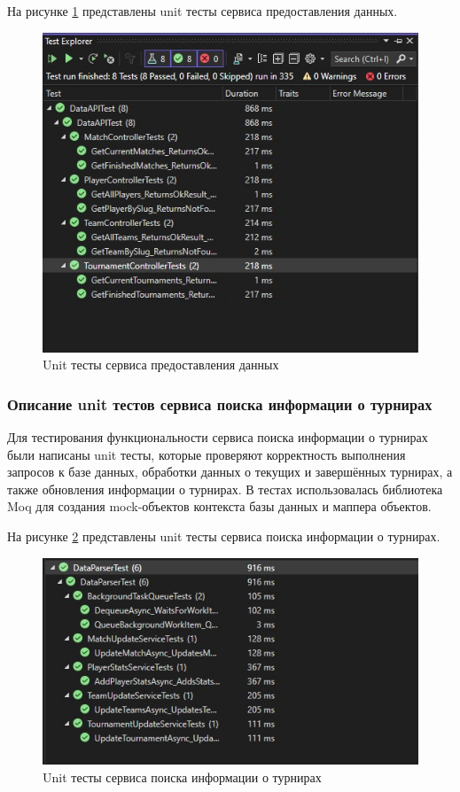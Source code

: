На рисунке \ref{fig:-UnitTestAPI} представлены unit тесты сервиса предоставления данных.

\begin{figure}
	\centering
	\includegraphics[width=0.9\linewidth]{"images/UnitTestAPI"}
	\caption{Unit тесты сервиса предоставления данных}
	\label{fig:-UnitTestAPI}
\end{figure}

\subsubsection{Описание unit тестов сервиса поиска информации о турнирах}

Для тестирования функциональности сервиса поиска информации о турнирах были написаны unit тесты, которые проверяют корректность выполнения запросов к базе данных, обработки данных о текущих и завершённых турнирах, а также обновления информации о турнирах. В тестах использовалась библиотека Moq для создания mock-объектов контекста базы данных и маппера объектов. 

На рисунке \ref{fig:-UnitTestDataParser} представлены unit тесты сервиса поиска информации о турнирах.

\begin{figure}
	\centering
	\includegraphics[width=0.9\linewidth]{"images/UnitTestDataParser"}
	\caption{Unit тесты сервиса поиска информации о турнирах}
	\label{fig:-UnitTestDataParser}
\end{figure}

